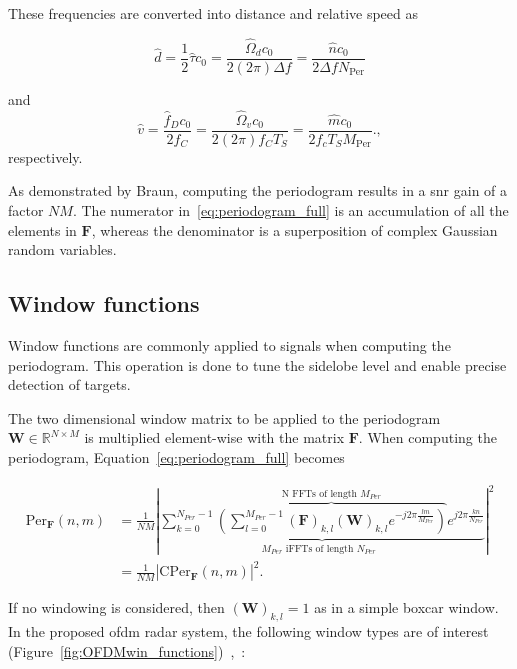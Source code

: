     These frequencies are converted into distance and relative speed as

    \begin{equation}
        \hat{d} = \frac{1}{2}\hat{\tau}c_0 = \frac{\hat{\Omega}_d c_0}{2 (2\pi) \Delta f} = \frac{\hat{n}c_0}{2\Delta f N_\text{Per}}
    \end{equation}
    
    and
    \begin{equation}
    	\hat{v} = \frac{\hat{f}_D c_0 }{2 f_C} = \frac{\hat{\Omega}_v c_0}{2(2\pi)f_CT_S} =  \frac{\hat{m}c_0}{2f_cT_S M_{\text{Per}}}.,
    \end{equation}
    respectively.
    
    
    

    As demonstrated by Braun, computing the periodogram results in a \gls{snr} gain of a factor $NM$. The numerator in~\eqref{eq:periodogram_full} is an accumulation of all the elements in $\mathbf F$, whereas the denominator is a superposition of complex Gaussian random variables.
    
    \newpage
	\subsection{Window functions}
	
	Window functions are commonly applied to signals when computing the periodogram. This operation is done to tune the sidelobe level and enable precise detection of targets. 
	
	The two dimensional window matrix to be applied to the periodogram $\mathbf W \in \mathbb{R}^{N\times M}$ is multiplied element-wise with the matrix $\mathbf F$. When computing the periodogram, Equation~\eqref{eq:periodogram_full} becomes
	
	
	   \begin{align}
		\text{Per}_{\mathbf F}(n,m) &= \frac{1}{NM} \left| \underbrace{ \sum_{k=0}^{N_{Per}-1}  \overbrace{\left( \sum_{l=0}^{M_{Per}-1} (\bm{F})_{k,l} (\mathbf W)_{k,l} e^{-j2\pi \frac{lm}{M_{Per}}} \right)}^{\text{N FFTs of length $M_{Per}$}}  e^{j2\pi\frac{kn}{N_{Per}}}}_{ \text{$M_{Per}$ iFFTs of length $N_{Per}$ }} \right| ^ 2\\
		&= \frac{1}{NM} \left| \text{CPer}_{\bm{F}}(n,m) \right| ^ 2.
		\end{align}
	 
	 If no windowing is considered, then $(\mathbf W)_{k,l} = 1$ as in a simple boxcar window.
	 In the proposed \gls{ofdm} radar system, the following window types are of interest (Figure~\ref{fig:OFDMwin_functions})~\cite{Braun2014OFDMRA},~\cite{SASPWEB2011}:
	 
